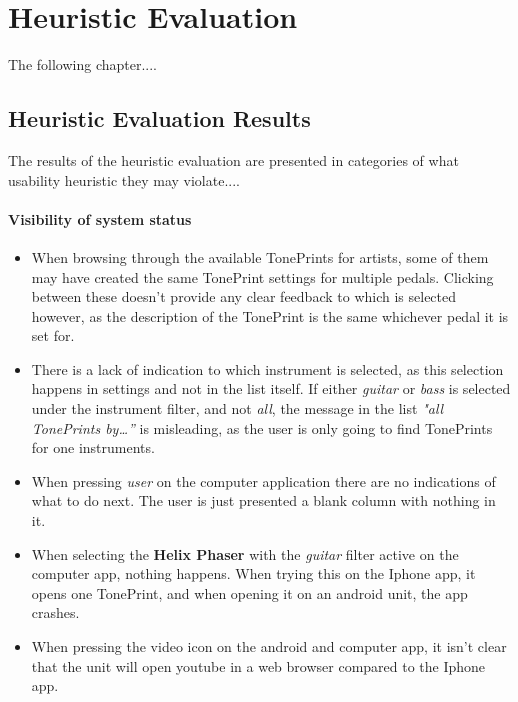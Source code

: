 \chapter{Heuristic Evaluation}
\label{HeursiticEvaluation}
The following chapter....

\section{Heuristic Evaluation Results}
\label{Heuristic_Results}
The results of the heuristic evaluation are presented in categories of what usability heuristic they may violate....

\subsubsection{Visibility of system status}
\begin{itemize}
	\item When browsing through the available TonePrints for artists, some of them may have created the same TonePrint settings for multiple pedals. Clicking between these doesn’t provide any clear feedback to which is selected however, as the description of the TonePrint is the same whichever pedal it is set for.\\
	\item There is a lack of indication to which instrument is selected, as this selection happens in settings and not in the list itself. If either \textit{guitar} or \textit{bass} is selected under the instrument filter, and not \textit{all}, the message in the list \textit{"all TonePrints by…”} is misleading, as the user is only going to find TonePrints for one instruments.\\
	\item When pressing \textit{user} on the computer application there are no indications of what to do next. The user is just presented a blank column with nothing in it.\\
	\item When selecting the \textbf{Helix Phaser} with the \textit{guitar} filter active on the computer app, nothing happens. When trying this on the Iphone app, it opens one TonePrint, and when opening it on an android unit, the app crashes.\\
	\item When pressing the video icon on the android and computer app, it isn't clear that the unit will open youtube in a web browser compared to the Iphone app.
\end{itemize}
%
